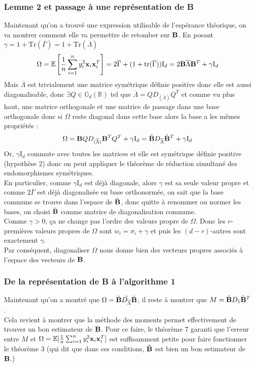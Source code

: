 \documentclass[12pt]{article}
\begin{document}
\subsubsection{Lemme 2 et passage à une représentation de \textbf{B}}
Maintenant qu'on a trouvé une expression utilisable de l'espérance théorique, on va montrer comment elle va permettre de retomber sur ${\bf B}$. En posant $\gamma = 1 + \text{Tr}(\overline{\Gamma}) = 1 + \text{Tr}(\overline{\Lambda})$ 
$$
\Omega = \mathbb{E}\left[\frac{1}{n} \sum_{i=1}^{n}y^2_i{\bf x}_i{\bf x}^T_i\right] = 2\overline{\Gamma} + (1+ \text{tr}{(\overline{\Gamma})})\text{I}_d = 2{\bf B}\overline{\Lambda}{\bf B}^T + \gamma \text{I}_d
$$
Mais $\overline{\Lambda}$ est trivialement une matrice symétrique définie positive donc elle est aussi diagonalisable, donc $\exists Q \in \mathbb{O}_d(\mathbb{R})$ tel que $\overline{\Lambda} = QD_{(\overline{\Lambda})}Q^T$ et comme vu plus haut, une matrice orthogonale et une matrice de passage dans une base orthogonale donc si $\Omega$ reste diagonal dans cette base alors la base a les mêmes propriétés :
$$
\Omega = {\bf B}QD_{(\overline{\Lambda})}{\bf B}^TQ^T + \gamma \text{I}_d = \tilde{{\bf B}}D_{\overline{\Lambda}}\tilde{{\bf B}}^T +  \gamma \text{I}_d
$$
Or, $\gamma\text{I}_d$ commute avec toutes les matrices et elle est symétrique définie positive (hypothèse 2) donc on peut appliquer le théorème de réduction simultané des endomorphismes symétriques.\\

\noindent En particulier, comme $\gamma\text{I}_d$ est déjà diagonale, alors $\gamma$ est sa seule valeur propre et comme $2\overline{\Gamma}$ est déjà diagonalisée en base orthonormée, on sait que la base commune se trouve dans l'espace de $\tilde{{\bf B}}$, donc quitte à renommer ou normer les bases, on choisi $\tilde{{\bf B}}$ comme matrice de diagonalisation commune. \\
Comme $\gamma > 0$, ça ne change pas l'ordre des valeurs propre de $\Omega$. Donc les $r$-premières valeurs propres de $\Omega$ sont $w_i = \sigma_i + \gamma$ et puis les $(d-r)$-autres sont exactement $\gamma$. \\
Par conséquent, diagonaliser $\Omega$ nous donne bien des vecteurs propres associés à l'espace des vecteurs de ${\bf B}$.

\subsubsection{De la représentation de B à l'algorithme 1}
Maintenant qu'on a montré que $\Omega = \tilde{{\bf B}}\tilde{D_{\overline{\Lambda}}}\tilde{{\bf B}}$, il reste à montrer que $M = \hat{{\bf B}}D_ 1\hat{{\bf B}}^T$.\\
Cela revient à montrer que la méthode des moments permet effectivement de trouver un bon estimateur de ${\bf B}$.
Pour ce faire, le théorème 7 garanti que l'erreur entre $M$ et $\Omega = \mathbb{E}[\frac{1}{n} \sum_{i=1}^{n}y^2_i{\bf x}_i{\bf x}^T_i]$ est suffisamment petite pour faire fonctionner le théorème 3 (qui dit que dans ces conditions, $\hat{{\bf B}}$ est bien un bon estimateur de ${\bf B}$.)
\end{document}
